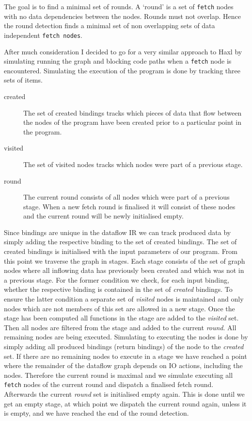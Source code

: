 The goal is to find a minimal set of rounds.
A `round' is a set of \texttt{fetch} nodes with no data dependencies between the nodes.
Rounds must not overlap.
Hence the round detection finds a minimal set of non overlapping sets of data independent \texttt{fetch nodes}.

After much consideration I decided to go for a very similar approach to Haxl by simulating running the graph and blocking code paths when a \texttt{fetch} node is encountered.
Simulating the execution of the program is done by tracking three sets of items.

\begin{description}
	\item[created] The set of created bindings tracks which pieces of data that flow between the nodes of the program have been created prior to a particular point in the program.
	\item[visited] The set of visited nodes tracks which nodes were part of a previous stage.
	\item[round] The current round consists of all \fetch{} nodes which were part of a previous stage.
	When a new fetch round is finalised it will consist of these \fetch{} nodes and the current round will be newly initialised empty.
\end{description}

Since bindings are unique in the dataflow IR we can track produced data by simply adding the respective binding to the set of created bindings.
The set of created bindings is initialised with the input parameters of our program.
From this point we traverse the graph in stages.
Each stage consists of the set of graph nodes where all inflowing data has previously been created and which was not in a previous stage.
For the former condition we check, for each input binding, whether the respective binding is contained in the set of \emph{created} bindings.
To ensure the latter condition a separate set of \emph{visited} nodes is maintained and only nodes which are not members of this set are allowed in a new stage.
Once the stage has been computed all functions in the stage are added to the \emph{visited} set.
Then all \fetch{} nodes are filtered from the stage and added to the current \emph{round}.
All remaining nodes are being executed.
Simulating to executing the nodes is done by simply adding all produced bindings (return bindings) of the node to the \emph{created} set.
If there are no remaining nodes to execute in a stage we have reached a point where the remainder of the dataflow graph depends on IO actions, including the \fetch{} nodes.
Therefore the current round is maximal and we simulate executing all \texttt{fetch} nodes of the current round and dispatch a finalised fetch round.
Afterwards the current \emph{round} set is initialised empty again.
This is done until we get an empty stage, at which point we dispatch the current round again, unless it is empty, and we have reached the end of the round detection.

